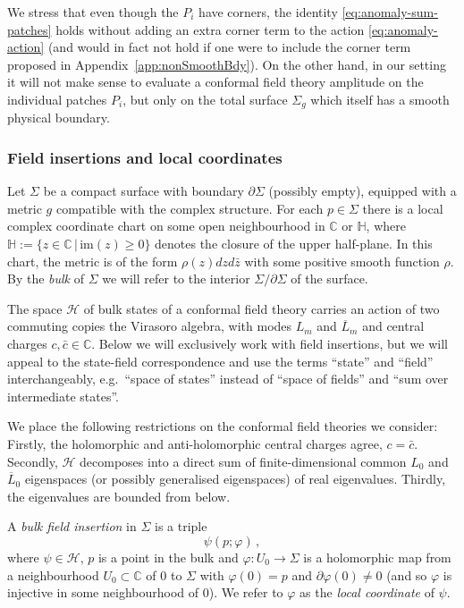 \documentclass[11pt,a4paper]{article}
\numberwithin{equation}{section}
\begin{document}
We stress that even though the $P_i$ have corners, the identity \eqref{eq:anomaly-sum-patches} holds without adding an extra corner term to the action \eqref{eq:anomaly-action} (and would in fact not hold if one were to include the corner term proposed in Appendix~\ref{app:nonSmoothBdy}).
On the other hand, in our setting it will not make sense to evaluate a conformal field theory amplitude on the individual patches $P_i$, but only on the total surface $\Sigma_g$ which itself has a smooth physical boundary.

\subsubsection{Field insertions and local coordinates}

Let $\Sigma$ be a compact surface with boundary $\partial\Sigma$ (possibly empty), equipped with a metric $g$ compatible with the complex structure. 
For each $p \in \Sigma$ there is a local complex coordinate chart on some open neighbourhood in $\mathbb{C}$ or $\mathbb{H}$, where $\mathbb{H} := \{ z \in \mathbb{C}\,|\, \mathrm{im}(z) \ge 0 \}$ denotes the closure of the upper half-plane. In this chart, the metric is of the form $\rho(z) dzd\bar{z}$ with some positive smooth function $\rho$. By the \textit{bulk} of $\Sigma$ we will refer to the interior $\Sigma/\partial\Sigma$ of the surface. 


\smallskip
The space $\mathcal{H}$ of bulk states of a conformal field theory carries an action of two commuting copies the Virasoro algebra, with modes $L_m$ and $\overline{L}_m$ and central charges $c, \bar c \in \mathbb{C}$. Below we will exclusively work with field insertions, but we will appeal to the state-field correspondence and use the terms ``state'' and ``field'' interchangeably, e.g.\ ``space of states'' instead of ``space of fields'' and ``sum over intermediate states''.

We place the following restrictions on the conformal field theories we consider: Firstly, the holomorphic and anti-holomorphic central charges agree, $c=\bar c$. Secondly, $\mathcal{H}$ decomposes into a direct sum of finite-dimensional common $L_0$ and $\overline{L}_0$ eigenspaces (or possibly generalised eigenspaces) of real eigenvalues. Thirdly, the eigenvalues are bounded from below.

\smallskip
A \textit{bulk field insertion} in $\Sigma$ is a triple 
%
\begin{equation}\label{eq:field-insertion}
    \psi(p;\varphi)\,,
\end{equation}
%
where $\psi\in \mathcal{H}$, $p$ is a point in the bulk and $\varphi: U_0\to\Sigma$ is a holomorphic map from a neighbourhood $U_0\subset\mathbb{C}$ of $0$ to $\Sigma$ with $\varphi(0) = p$ 
and $\partial\varphi(0) \neq 0$ 
(and so $\varphi$ is injective in some neighbourhood of $0$). 
We refer to $\varphi$ as the \textit{local coordinate} of $\psi$. 
\end{document}
